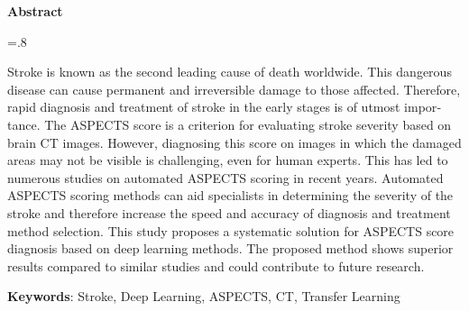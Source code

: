 


\pagestyle{empty}

\begin{latin}

\begin{center}
\textbf{Abstract}
\end{center}
\baselineskip=.8\baselineskip

Stroke is known as the second leading cause of death worldwide. This dangerous disease can cause permanent and irreversible damage to those affected. Therefore, rapid diagnosis and treatment of stroke in the early stages is of utmost importance. The ASPECTS score is a criterion for evaluating stroke severity based on brain CT images. However, diagnosing this score on images in which the damaged areas may not be visible is challenging, even for human experts. This has led to numerous studies on automated ASPECTS scoring in recent years. Automated ASPECTS scoring methods can aid specialists in determining the severity of the stroke and therefore increase the speed and accuracy of diagnosis and treatment method selection. This study proposes a systematic solution for ASPECTS score diagnosis based on deep learning methods. The proposed method shows superior results compared to similar studies and could contribute to future research.

\bigskip\noindent\textbf{Keywords}:
Stroke, Deep Learning, ASPECTS, CT, Transfer Learning

\end{latin}
